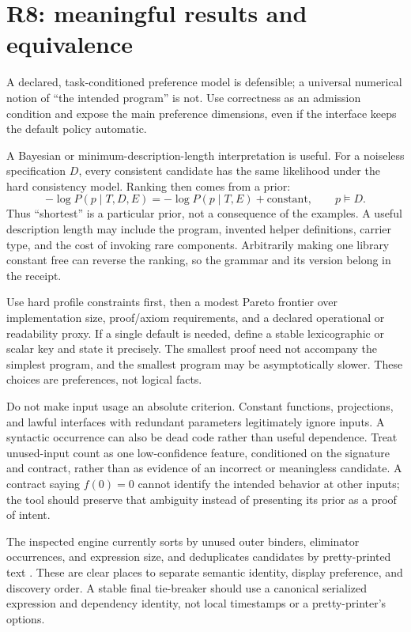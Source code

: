 \section{R8: meaningful results and equivalence}
\label{sec:ranking}

\ans A declared, task-conditioned preference model is defensible; a universal numerical notion of ``the intended program'' is not. Use correctness as an admission condition and expose the main preference dimensions, even if the interface keeps the default policy automatic.

A Bayesian or minimum-description-length interpretation is useful. For a noiseless specification $D$, every consistent candidate has the same likelihood under the hard consistency model. Ranking then comes from a prior:
\[
  -\log P(p\mid T,D,E)
  =-\log P(p\mid T,E)+\text{constant},\qquad p\models D.
\]
Thus ``shortest'' is a particular prior, not a consequence of the examples. A useful description length may include the program, invented helper definitions, carrier type, and the cost of invoking rare components. Arbitrarily making one library constant free can reverse the ranking, so the grammar and its version belong in the receipt.

Use hard profile constraints first, then a modest Pareto frontier over implementation size, proof/axiom requirements, and a declared operational or readability proxy. If a single default is needed, define a stable lexicographic or scalar key and state it precisely. The smallest proof need not accompany the simplest program, and the smallest program may be asymptotically slower. These choices are preferences, not logical facts.

Do not make input usage an absolute criterion. Constant functions, projections, and lawful interfaces with redundant parameters legitimately ignore inputs. A syntactic occurrence can also be dead code rather than useful dependence. Treat unused-input count as one low-confidence feature, conditioned on the signature and contract, rather than as evidence of an incorrect or meaningless candidate. A contract saying $f(0)=0$ cannot identify the intended behavior at other inputs; the tool should preserve that ambiguity instead of presenting its prior as a proof of intent.

The inspected engine currently sorts by unused outer binders, eliminator occurrences, and expression size, and deduplicates candidates by pretty-printed text \cite{engine}. These are clear places to separate semantic identity, display preference, and discovery order. A stable final tie-breaker should use a canonical serialized expression and dependency identity, not local timestamps or a pretty-printer's options.

